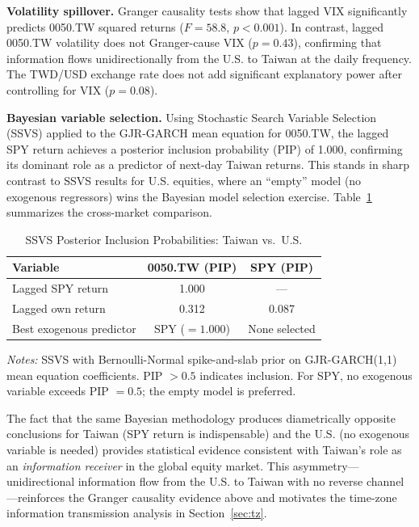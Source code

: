 \textbf{Volatility spillover.} Granger causality tests show that lagged VIX significantly predicts 0050.TW squared returns ($F = 58.8$, $p < 0.001$). In contrast, lagged 0050.TW volatility does not Granger-cause VIX ($p = 0.43$), confirming that information flows unidirectionally from the U.S. to Taiwan at the daily frequency. The TWD/USD exchange rate does not add significant explanatory power after controlling for VIX ($p = 0.08$).

\textbf{Bayesian variable selection.} Using Stochastic Search Variable Selection (SSVS) applied to the GJR-GARCH mean equation for 0050.TW, the lagged SPY return achieves a posterior inclusion probability (PIP) of 1.000, confirming its dominant role as a predictor of next-day Taiwan returns. This stands in sharp contrast to SSVS results for U.S. equities, where an ``empty'' model (no exogenous regressors) wins the Bayesian model selection exercise. Table~\ref{tab:ssvs_pip} summarizes the cross-market comparison.

\begin{table}[H]
\centering
\caption{SSVS Posterior Inclusion Probabilities: Taiwan vs.\ U.S.}
\label{tab:ssvs_pip}
\begin{tabular}{lcc}
\toprule
Variable & 0050.TW (PIP) & SPY (PIP) \\
\midrule
Lagged SPY return & 1.000 & --- \\
Lagged own return & 0.312 & 0.087 \\
Best exogenous predictor & SPY ($= 1.000$) & None selected \\
\bottomrule
\end{tabular}
\begin{flushleft}
\small \textit{Notes:} SSVS with Bernoulli-Normal spike-and-slab prior on GJR-GARCH(1,1) mean equation coefficients. PIP $> 0.5$ indicates inclusion. For SPY, no exogenous variable exceeds PIP $= 0.5$; the empty model is preferred.
\end{flushleft}
\end{table}

The fact that the same Bayesian methodology produces diametrically opposite conclusions for Taiwan (SPY return is indispensable) and the U.S. (no exogenous variable is needed) %
provides statistical evidence consistent with Taiwan's role as an \textit{information receiver} in the global equity market. This asymmetry---unidirectional information flow from the U.S. to Taiwan with no reverse channel---reinforces the Granger causality evidence above and motivates the time-zone information transmission analysis in Section~\ref{sec:tz}.

